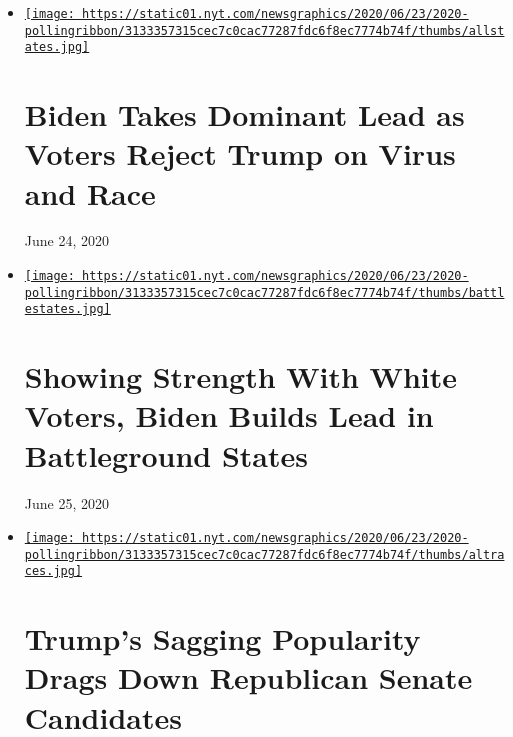 \begin{itemize}
\item
  \href{https://www.nytimes.com/2020/06/24/us/politics/trump-biden-poll-nyt-upshot-siena-college.html}{\texttt{[image: https://static01.nyt.com/newsgraphics/2020/06/23/2020-pollingribbon/3133357315cec7c0cac77287fdc6f8ec7774b74f/thumbs/allstates.jpg]}}

  \href{https://www.nytimes.com/2020/06/24/us/politics/trump-biden-poll-nyt-upshot-siena-college.html}{}

  \hypertarget{biden-takes-dominant-lead-as-voters-reject-trump-on-virus-and-race-1}{%
  \section{Biden Takes Dominant Lead as Voters Reject Trump on Virus and
  Race}\label{biden-takes-dominant-lead-as-voters-reject-trump-on-virus-and-race-1}}

  June 24, 2020
\item
  \href{https://www.nytimes.com/2020/06/25/upshot/poll-2020-biden-battlegrounds.html}{\texttt{[image: https://static01.nyt.com/newsgraphics/2020/06/23/2020-pollingribbon/3133357315cec7c0cac77287fdc6f8ec7774b74f/thumbs/battlestates.jpg]}}

  \href{https://www.nytimes.com/2020/06/25/upshot/poll-2020-biden-battlegrounds.html}{}

  \hypertarget{showing-strength-with-white-voters-biden-builds-lead-in-battleground-states}{%
  \section{Showing Strength With White Voters, Biden Builds Lead in
  Battleground
  States}\label{showing-strength-with-white-voters-biden-builds-lead-in-battleground-states}}

  June 25, 2020
\item
  \href{https://www.nytimes.com/2020/06/25/us/politics/trump-senate-republicans-poll.html}{\texttt{[image: https://static01.nyt.com/newsgraphics/2020/06/23/2020-pollingribbon/3133357315cec7c0cac77287fdc6f8ec7774b74f/thumbs/altraces.jpg]}}

  \href{https://www.nytimes.com/2020/06/25/us/politics/trump-senate-republicans-poll.html}{}

  \hypertarget{trumps-sagging-popularity-drags-down-republican-senate-candidates}{%
  \section{Trump's Sagging Popularity Drags Down Republican Senate
  Candidates}\label{trumps-sagging-popularity-drags-down-republican-senate-candidates}}


\end{itemize}
